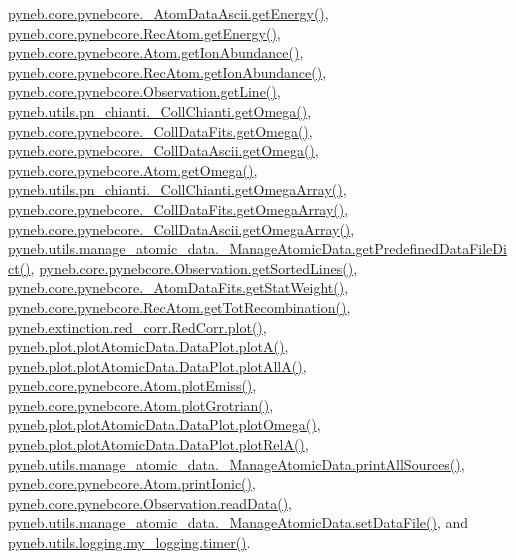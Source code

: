 \hyperlink{pynebcore_8py_source_l00525}{pyneb.\+core.\+pynebcore.\+\_\+\+Atom\+Data\+Ascii.\+get\+Energy()}, \hyperlink{pynebcore_8py_source_l02811}{pyneb.\+core.\+pynebcore.\+Rec\+Atom.\+get\+Energy()}, \hyperlink{pynebcore_8py_source_l02110}{pyneb.\+core.\+pynebcore.\+Atom.\+get\+Ion\+Abundance()}, \hyperlink{pynebcore_8py_source_l02961}{pyneb.\+core.\+pynebcore.\+Rec\+Atom.\+get\+Ion\+Abundance()}, \hyperlink{pynebcore_8py_source_l03543}{pyneb.\+core.\+pynebcore.\+Observation.\+get\+Line()}, \hyperlink{pn__chianti_8py_source_l00484}{pyneb.\+utils.\+pn\+\_\+chianti.\+\_\+\+Coll\+Chianti.\+get\+Omega()}, \hyperlink{pynebcore_8py_source_l00811}{pyneb.\+core.\+pynebcore.\+\_\+\+Coll\+Data\+Fits.\+get\+Omega()}, \hyperlink{pynebcore_8py_source_l01063}{pyneb.\+core.\+pynebcore.\+\_\+\+Coll\+Data\+Ascii.\+get\+Omega()}, \hyperlink{pynebcore_8py_source_l01262}{pyneb.\+core.\+pynebcore.\+Atom.\+get\+Omega()}, \hyperlink{pn__chianti_8py_source_l00461}{pyneb.\+utils.\+pn\+\_\+chianti.\+\_\+\+Coll\+Chianti.\+get\+Omega\+Array()}, \hyperlink{pynebcore_8py_source_l00783}{pyneb.\+core.\+pynebcore.\+\_\+\+Coll\+Data\+Fits.\+get\+Omega\+Array()}, \hyperlink{pynebcore_8py_source_l01039}{pyneb.\+core.\+pynebcore.\+\_\+\+Coll\+Data\+Ascii.\+get\+Omega\+Array()}, \hyperlink{manage__atomic__data_8py_source_l00034}{pyneb.\+utils.\+manage\+\_\+atomic\+\_\+data.\+\_\+\+Manage\+Atomic\+Data.\+get\+Predefined\+Data\+File\+Dict()}, \hyperlink{pynebcore_8py_source_l03562}{pyneb.\+core.\+pynebcore.\+Observation.\+get\+Sorted\+Lines()}, \hyperlink{pynebcore_8py_source_l00242}{pyneb.\+core.\+pynebcore.\+\_\+\+Atom\+Data\+Fits.\+get\+Stat\+Weight()}, \hyperlink{pynebcore_8py_source_l02735}{pyneb.\+core.\+pynebcore.\+Rec\+Atom.\+get\+Tot\+Recombination()}, \hyperlink{red__corr_8py_source_l00303}{pyneb.\+extinction.\+red\+\_\+corr.\+Red\+Corr.\+plot()}, \hyperlink{plot_atomic_data_8py_source_l00116}{pyneb.\+plot.\+plot\+Atomic\+Data.\+Data\+Plot.\+plot\+A()}, \hyperlink{plot_atomic_data_8py_source_l00188}{pyneb.\+plot.\+plot\+Atomic\+Data.\+Data\+Plot.\+plot\+All\+A()}, \hyperlink{pynebcore_8py_source_l02313}{pyneb.\+core.\+pynebcore.\+Atom.\+plot\+Emiss()}, \hyperlink{pynebcore_8py_source_l02372}{pyneb.\+core.\+pynebcore.\+Atom.\+plot\+Grotrian()}, \hyperlink{plot_atomic_data_8py_source_l00372}{pyneb.\+plot.\+plot\+Atomic\+Data.\+Data\+Plot.\+plot\+Omega()}, \hyperlink{plot_atomic_data_8py_source_l00261}{pyneb.\+plot.\+plot\+Atomic\+Data.\+Data\+Plot.\+plot\+Rel\+A()}, \hyperlink{manage__atomic__data_8py_source_l00431}{pyneb.\+utils.\+manage\+\_\+atomic\+\_\+data.\+\_\+\+Manage\+Atomic\+Data.\+print\+All\+Sources()}, \hyperlink{pynebcore_8py_source_l02167}{pyneb.\+core.\+pynebcore.\+Atom.\+print\+Ionic()}, \hyperlink{pynebcore_8py_source_l03589}{pyneb.\+core.\+pynebcore.\+Observation.\+read\+Data()}, \hyperlink{manage__atomic__data_8py_source_l00380}{pyneb.\+utils.\+manage\+\_\+atomic\+\_\+data.\+\_\+\+Manage\+Atomic\+Data.\+set\+Data\+File()}, and \hyperlink{logging_8py_source_l00115}{pyneb.\+utils.\+logging.\+my\+\_\+logging.\+timer()}.

